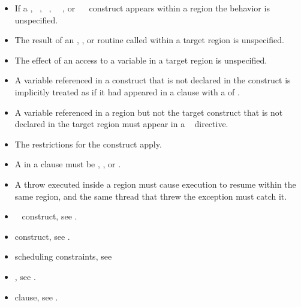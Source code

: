 \restrictions
\begin{itemize}
\item If a , ~, ~, ~~, or ~~ construct appears within a  region the behavior is unspecified.

\item The result of an , , 
or  routine called within a target region is unspecified.

\item The effect of an access to a  variable in a target region is 
unspecified.

\item A variable referenced in a  construct that is not declared in the construct 
is implicitly treated as if it had appeared in a  clause with a  of 
.

\item A variable referenced in a  region but not the target construct that is not 
declared in the target region must appear in a ~ directive. 

\item The restrictions for the  construct apply.
\item A  in a  clause must be , ,  or .


\cppspecificstart
\item A throw executed inside a  region must cause execution to resume within the 
same  region, and the same thread that threw the exception must catch it. 
\cppspecificend
\end{itemize}

\crossreferences
\begin{itemize}
\item {}~ construct, see 
.

\item {} construct, see 
.

\item {} scheduling constraints, see 

\item {}, see 
. 

\item {} clause, see 
.
\end{itemize}









